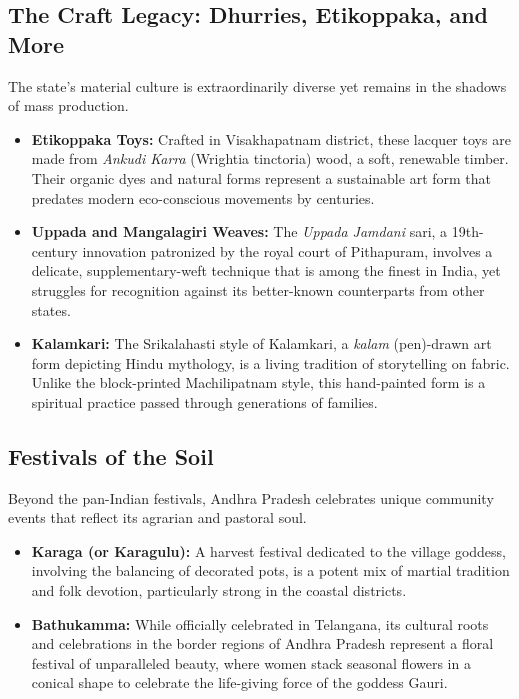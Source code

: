 \documentclass{article}
\begin{document}
\subsection{The Craft Legacy: Dhurries, Etikoppaka, and More}
The state's material culture is extraordinarily diverse yet remains in the shadows of mass production.
\begin{itemize}
    \item \textbf{Etikoppaka Toys:} Crafted in Visakhapatnam district, these lacquer toys are made from \textit{Ankudi Karra} (Wrightia tinctoria) wood, a soft, renewable timber. Their organic dyes and natural forms represent a sustainable art form that predates modern eco-conscious movements by centuries.
    \item \textbf{Uppada and Mangalagiri Weaves:} The \textit{Uppada Jamdani} sari, a 19th-century innovation patronized by the royal court of Pithapuram, involves a delicate, supplementary-weft technique that is among the finest in India, yet struggles for recognition against its better-known counterparts from other states.
    \item \textbf{Kalamkari:} The Srikalahasti style of Kalamkari, a \textit{kalam} (pen)-drawn art form depicting Hindu mythology, is a living tradition of storytelling on fabric. Unlike the block-printed Machilipatnam style, this hand-painted form is a spiritual practice passed through generations of families.
\end{itemize}

\subsection{Festivals of the Soil}
Beyond the pan-Indian festivals, Andhra Pradesh celebrates unique community events that reflect its agrarian and pastoral soul.
\begin{itemize}
    \item \textbf{Karaga (or Karagulu):} A harvest festival dedicated to the village goddess, involving the balancing of decorated pots, is a potent mix of martial tradition and folk devotion, particularly strong in the coastal districts.
    \item \textbf{Bathukamma:} While officially celebrated in Telangana, its cultural roots and celebrations in the border regions of Andhra Pradesh represent a floral festival of unparalleled beauty, where women stack seasonal flowers in a conical shape to celebrate the life-giving force of the goddess Gauri.
\end{itemize}
\end{document}
